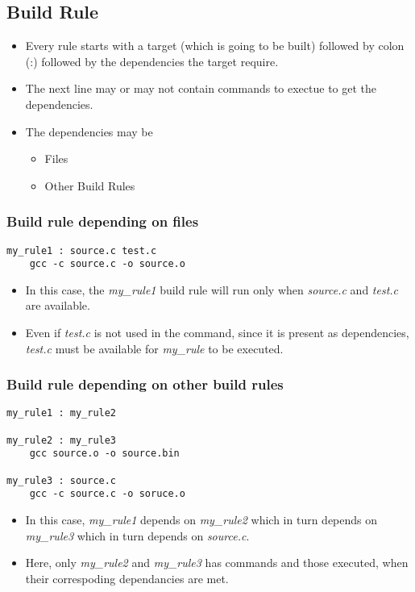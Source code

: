\documentclass{article}
\begin{document}
\subsection{Build Rule}
\begin{itemize}
    \item Every rule starts with a target (which is going to be built) followed by colon (:) followed by the dependencies the target require.
    \item The next line may or may not contain commands to exectue to get the dependencies.
    \item The dependencies may be
          \begin{itemize}
              \item Files
              \item Other Build Rules
          \end{itemize}

\end{itemize}


\subsubsection{Build rule depending on files}
\begin{verbatim}
my_rule1 : source.c test.c
    gcc -c source.c -o source.o
\end{verbatim}
\begin{itemize}
    \item In this case, the \emph{my\_rule1} build rule will run only when \emph{source.c} and \emph{test.c} are available.
    \item Even if \emph{test.c} is not used in the command, since it is present as dependencies, \emph{test.c} must be available for \emph{my\_rule} to be executed.
\end{itemize}


\subsubsection{Build rule depending on other build rules}
\begin{verbatim}
my_rule1 : my_rule2

my_rule2 : my_rule3
    gcc source.o -o source.bin

my_rule3 : source.c
    gcc -c source.c -o soruce.o
\end{verbatim}
\begin{itemize}
    \item In this case, \emph{my\_rule1} depends on \emph{my\_rule2} which in turn depends on \emph{my\_rule3} which in turn depends on \emph{source.c}.
    \item Here, only \emph{my\_rule2} and \emph{my\_rule3} has commands and those executed, when their correspoding dependancies are met.
\end{itemize}
\end{document}
